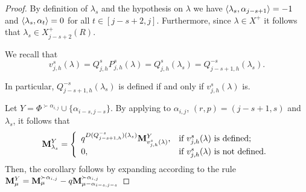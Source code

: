 \begin{proof}
By definition of $\lambda_s$ and the hypothesis on $\lambda$  we have   $\langle \lambda_{s} , \alpha_{j-s+1} \rangle = -1$ and $\langle \lambda_{s} , \alpha_{t} \rangle = 0$ for all $t\in [j-s+2,j]$. 
Furthermore, since $\lambda \in X^+$ it follows that $\lambda_{s}\in X^+_{j-s+2}(R)$. 


We recall that
\begin{equation}
  v^{s}_{j,h}(\lambda) = Q^s_{j,h}P^{s}_{j,h}(\lambda) = Q^s_{j,h}(\lambda_s)= Q^{-s}_{j-s+1,h}(\lambda_s ).   
\end{equation}

In particular,  $Q^{-s}_{j-s+1,h}(\lambda_s )$ is defined if and only if   $v^{s}_{j,h}(\lambda)$ is. 

Let  $Y = \Phi^{\succ \alpha_{i,j}}   \cup \{ \alpha_{i-s,j-s} \}$.
By applying  to $\alpha_{i,j}$, $(r,p) = (j-s+1,s)$ and $\lambda_{s}$, it follows that
\begin{equation}\label{eq: 4.21 pre completar v}
            \mathbf{M}_{\lambda_s}^{Y} = \left\{\begin{array}{ll}
               q^{D(Q^{-s}_{j-s+1,h})(\lambda_{s})}\mathbf{M}_{v^s_{j,h}(\lambda )}^{Y}, &\mbox{if } v^s_{j,h}(\lambda) \mbox{ is defined}; \\
                0, & \mbox{if } v^s_{j,h}(\lambda) \mbox{ is not  defined}.
            \end{array}\right.
        \end{equation}
Then, the corollary follows by expanding according to the rule $\mathbf{M}_{\mu}^{Y} = \mathbf{M}_{\mu}^{\succ \alpha_{i,j}} - q \mathbf{M}_{\mu -\alpha_{i-s,j-s}}^{\succ \alpha_{i,j}}$
\end{proof}



